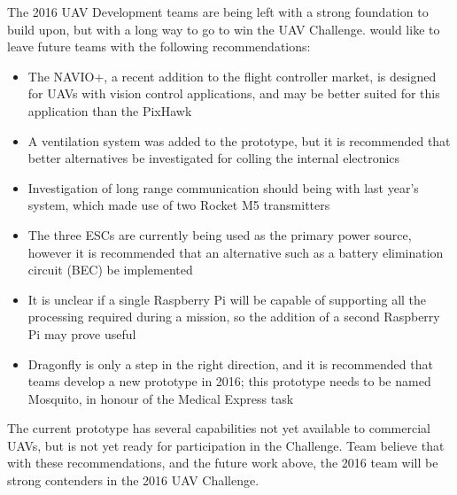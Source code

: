The 2016 UAV Development teams are being left with a strong foundation to build upon, but with a long way to go to win the UAV Challenge. \ID would like to leave future teams with the following recommendations:

\begin{itemize}
	\item The NAVIO+\cite{ref:navio}, a recent addition to the flight controller market, is designed for UAVs with vision control applications, and may be better suited for this application than the PixHawk
	\item A ventilation system was added to the prototype, but it is recommended that better alternatives be investigated for colling the internal electronics
	\item Investigation of long range communication should being with last year's system, which made use of two Rocket M5 transmitters
	\item The three ESCs are currently being used as the primary power source, however it is recommended that an alternative such as a battery elimination circuit (BEC) be implemented
	\item It is unclear if a single Raspberry Pi will be capable of supporting all the processing required during a mission, so the addition of a second Raspberry Pi may prove useful
	\item Dragonfly is only a step in the right direction, and it is recommended that teams develop a new prototype in 2016; this prototype needs to be named Mosquito, in honour of the Medical Express task
\end{itemize}

The current prototype has several capabilities not yet available to commercial UAVs, but is not yet ready for participation in the Challenge. Team \ID believe that with these recommendations, and the future work above, the 2016 team will be strong contenders in the 2016 UAV Challenge.